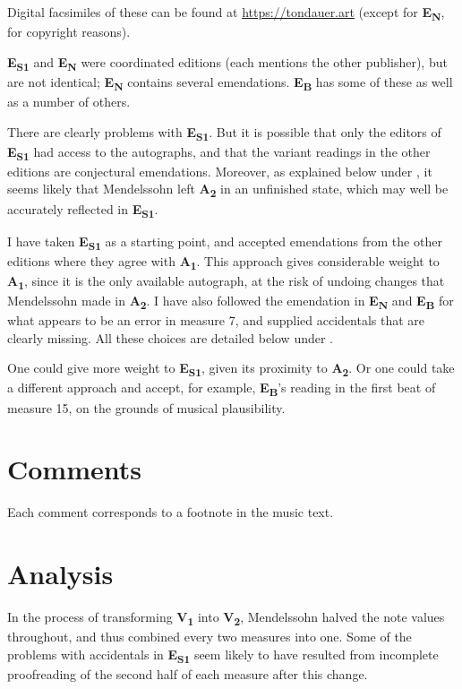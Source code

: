 \documentclass[a4paper, 12pt]{book}
\newcommand{\source}[2]{\textbf{#1\textsubscript{#2}}}
\begin{document}
{    Digital facsimiles of these can be found at
    \url{https://tondauer.art} (except for \source{E}{N}, for
    copyright reasons).

    \source{E}{S1} and \source{E}{N} were coordinated editions (each
    mentions the other publisher), but are not identical;
    \source{E}{N} contains several emendations. \source{E}{B} has some
    of these as well as a number of others.

    There are clearly problems with \source{E}{S1}. But it is possible
    that only the editors of \source{E}{S1} had access to the
    autographs, and that the variant readings in the other editions
    are conjectural emendations. Moreover, as explained below under
    , it seems likely that Mendelssohn left
    \source{A}{2} in an unfinished state, which may well be accurately
    reflected in \source{E}{S1}.

    I have taken \source{E}{S1} as a starting point, and accepted
    emendations from the other editions where they agree with
    \source{A}{1}. This approach gives considerable weight to
    \source{A}{1}, since it is the only available autograph, at the
    risk of undoing changes that Mendelssohn made in \source{A}{2}.
    I have also followed the emendation in \source{E}{N} and
    \source{E}{B} for what appears to be an error in measure 7, and
    supplied accidentals that are clearly missing. All these choices
    are detailed below under .

    One could give more weight to \source{E}{S1}, given its proximity
    to \source{A}{2}. Or one could take a different approach and
    accept, for example, \source{E}{B}'s reading in the first beat of
    measure 15, on the grounds of musical plausibility.
    
    \section*{Comments}
    \label{sec:comments}

    Each comment corresponds to a footnote in the music text.

    

    \section*{Analysis}
    \label{sec:analysis}

    In the process of transforming \source{V}{1} into \source{V}{2},
    Mendelssohn halved the note values throughout, and thus combined
    every two measures into one. Some of the problems with accidentals
    in \source{E}{S1} seem likely to have resulted from incomplete
    proofreading of the second half of each measure after this
    change.

}
\end{document}
